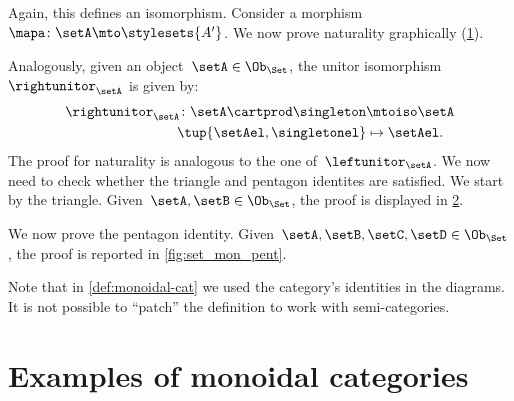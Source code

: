 \begin{example}
    Again, this defines an isomorphism.
    Consider a morphism~$\mapa\colon \setA\mto \stylesets{A'}$.
    We now prove naturality graphically (\cref{fig:monoidal_set_unit_nat}).
    
    \begin{figure}[h!]
        \centering
        \caption{}
        \label{fig:monoidal_set_unit_nat}
    \end{figure}
    
    Analogously, given an object~$\setA\in \Ob_{\Set}$, the unitor isomorphism~$\rightunitor_\setA$ is given by:
    \begin{equation*}
        \label{eq:set_mon_prod_5}
        \begin{aligned}
            \rightunitor_\setA\colon \setA\cartprod \singleton &\mtoiso \setA\\
            \tup{\setAel,\singletonel}&\mapsto \setAel.
        \end{aligned}
    \end{equation*}
    The proof for naturality is analogous to the one of~$\leftunitor_\setA$.
    We now need to check whether the triangle and pentagon identites are satisfied.
    We start by the triangle.
    Given~$\setA,\setB\in \Ob_{\Set}$, the proof is displayed in \cref{fig:set_mon_triangle}.
    
    \begin{figure}[h]
        \centering
        \caption{}
        \label{fig:set_mon_triangle}
    \end{figure}
    
    We now prove the pentagon identity.
    Given~$\setA,\setB,\setC,\setD\in \Ob_\Set$, the proof is reported in \cref{fig:set_mon_pent}.
    
    \begin{figure*}[h]
        \centering
        \caption{}
        \label{fig:set_mon_pent}
    \end{figure*}
\end{example}

\begin{remark}
    Note that in \cref{def:monoidal-cat} we used the category's identities in the diagrams.
    It is not possible to ``patch'' the definition to work with semi-categories.
\end{remark}


\section{Examples of monoidal categories}

